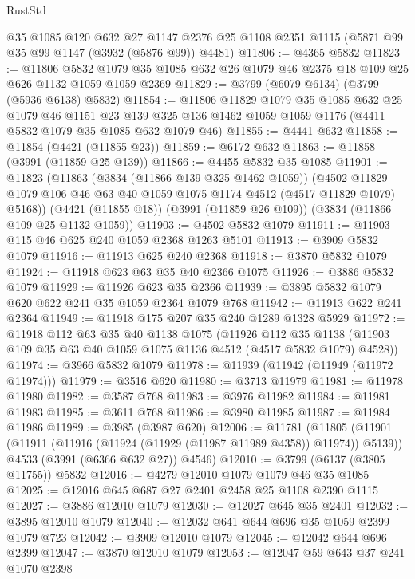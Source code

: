 \begin{lexlean}{RustStd}
\begin{coremodule}
    @35
    @1085
    @120
    @632
    @27
    @1147
    @2376
    @25
    @1108
    @2351
    @1115
    (@5871 @99 @35 @99 @1147 (@3932 (@5876 @99)) @4481)
@11806 := @4365 @5832
@11823 := @11806
    @5832
    @1079
    @35
    @1085
    @632
    @26
    @1079
    @46
    @2375
    @18
    @109
    @25
    @626
    @1132
    @1059
    @1059
    @2369
@11829 := @3799 (@6079 @6134) (@3799 (@5936 @6138) @5832)
@11854 := @11806
    @11829
    @1079
    @35
    @1085
    @632
    @25
    @1079
    @46
    @1151
    @23
    @139
    @325
    @136
    @1462
    @1059
    @1059
    @1176
    (@4411 @5832 @1079 @35 @1085 @632 @1079 @46)
@11855 := @4441 @632
@11858 := @11854 (@4421 (@11855 @23))
@11859 := @6172 @632
@11863 := @11858 (@3991 (@11859 @25 @139))
@11866 := @4455 @5832 @35 @1085
@11901 := @11823
    (@11863
      (@3834 (@11866 @139 @325 @1462 @1059))
      (@4502 @11829 @1079 @106 @46 @63 @40 @1059 @1075 @1174 @4512 (@4517 @11829 @1079) @5168))
    (@4421 (@11855 @18))
    (@3991 (@11859 @26 @109))
    (@3834 (@11866 @109 @25 @1132 @1059))
@11903 := @4502 @5832 @1079
@11911 := @11903 @115 @46 @625 @240 @1059 @2368 @1263 @5101
@11913 := @3909 @5832 @1079
@11916 := @11913 @625 @240 @2368
@11918 := @3870 @5832 @1079
@11924 := @11918 @623 @63 @35 @40 @2366 @1075
@11926 := @3886 @5832 @1079
@11929 := @11926 @623 @35 @2366
@11939 := @3895 @5832 @1079 @620 @622 @241 @35 @1059 @2364 @1079 @768
@11942 := @11913 @622 @241 @2364
@11949 := @11918 @175 @207 @35 @240 @1289 @1328 @5929
@11972 := @11918
    @112
    @63
    @35
    @40
    @1138
    @1075
    (@11926
      @112
      @35
      @1138
      (@11903 @109 @35 @63 @40 @1059 @1075 @1136 @4512 (@4517 @5832 @1079) @4528))
@11974 := @3966 @5832 @1079
@11978 := @11939 (@11942 (@11949 (@11972 @11974)))
@11979 := @3516 @620
@11980 := @3713 @11979
@11981 := @11978 @11980
@11982 := @3587 @768
@11983 := @3976 @11982
@11984 := @11981 @11983
@11985 := @3611 @768
@11986 := @3980 @11985
@11987 := @11984 @11986
@11989 := @3985 (@3987 @620)
@12006 := @11781
    (@11805
      (@11901 (@11911 (@11916 (@11924 (@11929 (@11987 @11989 @4358)) @11974)) @5139))
      @4533
      (@3991 (@6366 @632 @27))
      @4546)
@12010 := @3799 (@6137 (@3805 @11755)) @5832
@12016 := @4279 @12010 @1079 @1079 @46 @35 @1085
@12025 := @12016 @645 @687 @27 @2401 @2458 @25 @1108 @2390 @1115
@12027 := @3886 @12010 @1079
@12030 := @12027 @645 @35 @2401
@12032 := @3895 @12010 @1079
@12040 := @12032 @641 @644 @696 @35 @1059 @2399 @1079 @723
@12042 := @3909 @12010 @1079
@12045 := @12042 @644 @696 @2399
@12047 := @3870 @12010 @1079
@12053 := @12047 @59 @643 @37 @241 @1070 @2398

\end{coremodule}
\end{lexlean}
